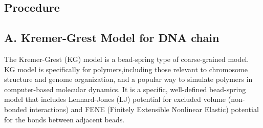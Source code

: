 \documentclass[12pt]{article}
\begin{document}
\begin{flushleft}

\vspace{-1em} 
\section*{Procedure} 
\subsection*{A. Kremer-Grest Model for DNA chain}

	
The Kremer-Grest (KG) model is a bead-spring type of coarse-grained model. KG model is specifically for polymers,including those relevant to chromosome structure and genome organization, and a popular way to simulate polymers in computer-based molecular dynamics. It is a specific, well-defined bead-spring model that includes Lennard-Jones (LJ) potential for excluded volume (non-bonded interactions) and FENE (Finitely Extensible Nonlinear Elastic) potential for the bonds between adjacent beads.	



\end{flushleft}
\end{document}
